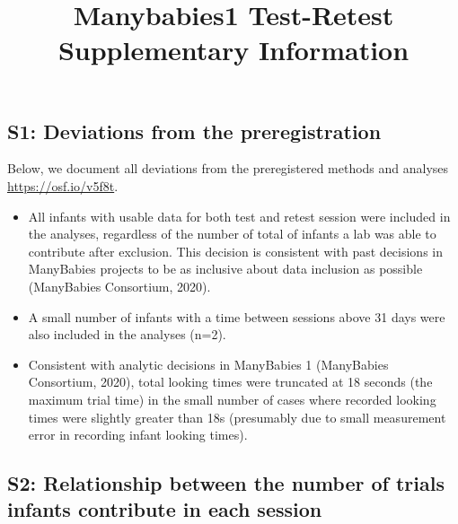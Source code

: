 \documentclass[
  man, donotrepeattitle,floatsintext]{apa6}
\title{Manybabies1 Test-Retest Supplementary Information}
\author{\phantom{0}}
\date{}
\affiliation{\phantom{0}}
\providecommand{\tightlist}{%
  \setlength{\itemsep}{0pt}\setlength{\parskip}{0pt}}
\begin{document}
\maketitle

\hypertarget{s1-deviations-from-the-preregistration}{%
\subsection{S1: Deviations from the preregistration}\label{s1-deviations-from-the-preregistration}}

Below, we document all deviations from the preregistered methods and analyses \url{https://osf.io/v5f8t}.

\begin{itemize}
\tightlist
\item
  All infants with usable data for both test and retest session were included in the analyses, regardless of the number of total of infants a lab was able to contribute after exclusion. This decision is consistent with past decisions in ManyBabies projects to be as inclusive about data inclusion as possible (ManyBabies Consortium, 2020).
\item
  A small number of infants with a time between sessions above 31 days were also included in the analyses (n=2).
\item
  Consistent with analytic decisions in ManyBabies 1 (ManyBabies Consortium, 2020), total looking times were truncated at 18 seconds (the maximum trial time) in the small number of cases where recorded looking times were slightly greater than 18s (presumably due to small measurement error in recording infant looking times).
\end{itemize}

\hypertarget{s2-relationship-between-the-number-of-trials-infants-contribute-in-each-session}{%
\subsection{S2: Relationship between the number of trials infants contribute in each session}\label{s2-relationship-between-the-number-of-trials-infants-contribute-in-each-session}}
\end{document}
